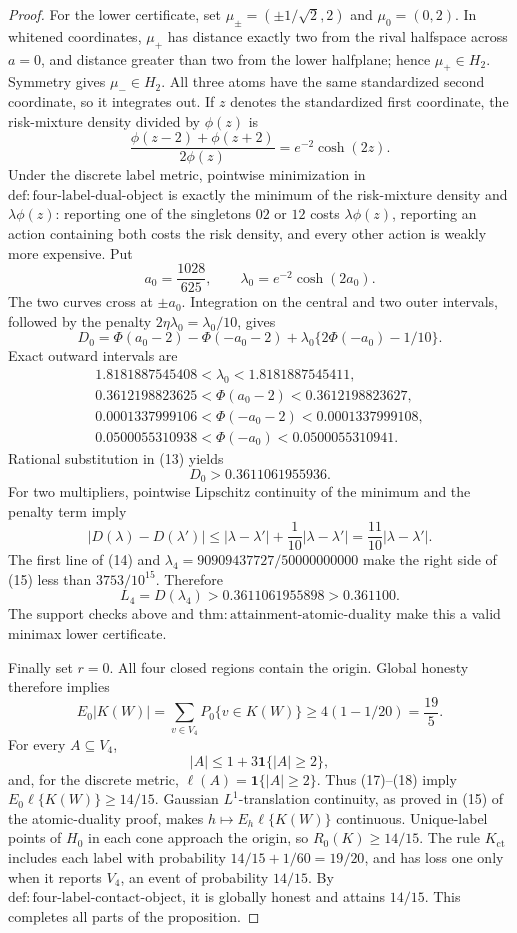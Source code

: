 \documentclass{article}
\begin{document}
\begin{proof}
For the lower certificate, set
\(\mu_\pm=(\pm1/\sqrt2,2)\) and \(\mu_0=(0,2)\).
In whitened coordinates, \(\mu_+\) has distance exactly two from the rival
halfspace across \(a=0\), and distance greater than two from the lower
halfplane; hence \(\mu_+\in H_2\).  Symmetry gives \(\mu_-\in H_2\).
All three atoms have the same standardized second coordinate, so it
integrates out.  If \(z\) denotes the standardized first coordinate, the
risk-mixture density divided by \(\phi(z)\) is
\[
 \frac{\phi(z-2)+\phi(z+2)}{2\phi(z)}
 =e^{-2}\cosh(2z).
\tag{11}
\]
Under the discrete label metric, pointwise minimization in
\(\mathrm{def:four\mbox{-}label\mbox{-}dual\mbox{-}object}\) is exactly the
minimum of the risk-mixture density and \(\lambda\phi(z)\): reporting one
of the singletons \(02\) or \(12\) costs \(\lambda\phi(z)\), reporting an
action containing both costs the risk density, and every other action is
weakly more expensive.  Put
\[
 a_0=\frac{1028}{625},\qquad
 \lambda_0=e^{-2}\cosh(2a_0).
\tag{12}
\]
The two curves cross at \(\pm a_0\).  Integration on the central and two
outer intervals, followed by the penalty
\(2\eta\lambda_0=\lambda_0/10\), gives
\[
 D_0=
 \Phi(a_0-2)-\Phi(-a_0-2)
 +\lambda_0\{2\Phi(-a_0)-1/10\}.
\tag{13}
\]
Exact outward intervals are
\[
 \begin{gathered}
 1.8181887545408<\lambda_0<1.8181887545411,\\
 0.3612198823625<\Phi(a_0-2)<0.3612198823627,\\
 0.0001337999106<\Phi(-a_0-2)<0.0001337999108,\\
 0.0500055310938<\Phi(-a_0)<0.0500055310941.
 \end{gathered}
\tag{14}
\]
Rational substitution in (13) yields
\[
 D_0>0.3611061955936.
\]
For two multipliers, pointwise Lipschitz continuity of the minimum and the
penalty term imply
\[
 |D(\lambda)-D(\lambda')|
 \leq |\lambda-\lambda'|+\frac1{10}|\lambda-\lambda'|
 =\frac{11}{10}|\lambda-\lambda'|.
\tag{15}
\]
The first line of (14) and
\(\lambda_4=90909437727/50000000000\) make the right side of (15) less
than \(3753/10^{15}\).  Therefore
\[
 L_4=D(\lambda_4)>0.3611061955898>0.361100.
\tag{16}
\]
The support checks above and
\(\mathrm{thm:attainment\mbox{-}atomic\mbox{-}duality}\) make this a valid
minimax lower certificate.

Finally set \(r=0\).  All four closed regions contain the origin.  Global
honesty therefore implies
\[
 E_0|K(W)|=\sum_{v\in V_4}P_0\{v\in K(W)\}
 \geq4(1-1/20)=\frac{19}{5}.
\tag{17}
\]
For every \(A\subseteq V_4\),
\[
 |A|\leq1+3\mathbf1\{|A|\geq2\},
\tag{18}
\]
and, for the discrete metric, \(\ell(A)=\mathbf1\{|A|\geq2\}\).
Thus (17)--(18) imply
\(E_0\ell\{K(W)\}\geq14/15\).  Gaussian \(L^1\)-translation continuity,
as proved in (15) of the atomic-duality proof, makes
\(h\mapsto E_h\ell\{K(W)\}\) continuous.  Unique-label points of \(H_0\)
in each cone approach the origin, so \(R_0(K)\geq14/15\).
The rule \(K_{\mathrm{ct}}\) includes each label with probability
\(14/15+1/60=19/20\), and has loss one only when it reports \(V_4\), an
event of probability \(14/15\).  By
\(\mathrm{def:four\mbox{-}label\mbox{-}contact\mbox{-}object}\), it is
globally honest and attains \(14/15\).  This completes all parts of the
proposition.
\end{proof}
\end{document}
